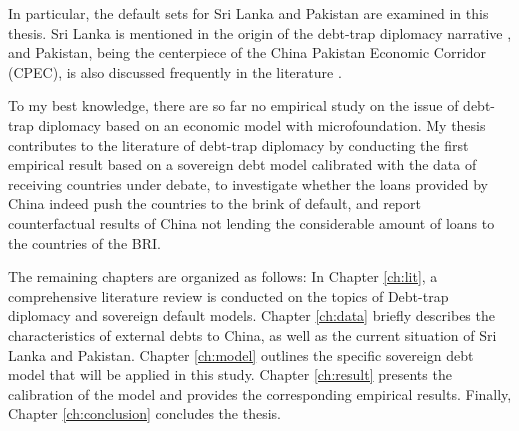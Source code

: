 In particular, the default sets for Sri Lanka and Pakistan are examined in this thesis. Sri Lanka is mentioned in the origin of the debt-trap diplomacy narrative \citep{Chellaney_2017}, and Pakistan, being the centerpiece of the China Pakistan Economic Corridor (CPEC), is also discussed frequently in the literature \citep{Hurley19-8-debt-trap}.

To my best knowledge, there are so far no empirical study on the issue of debt-trap diplomacy based on an economic model with microfoundation. My thesis contributes to the literature of debt-trap diplomacy by conducting the first empirical result based on a sovereign debt model calibrated with the data of receiving countries under debate, to investigate whether the loans provided by China indeed push the countries to the brink of default, and report counterfactual results of China not lending the considerable amount of loans to the countries of the BRI.

The remaining chapters are organized as follows:
In Chapter \ref{ch:lit}, a comprehensive literature review is conducted on the topics of Debt-trap diplomacy and sovereign default models.
Chapter \ref{ch:data} briefly describes the characteristics of external debts to China, as well as the current situation of Sri Lanka and Pakistan.
Chapter \ref{ch:model} outlines the specific sovereign debt model that will be applied in this study.
Chapter \ref{ch:result} presents the calibration of the model and provides the corresponding empirical results.
Finally, Chapter \ref{ch:conclusion} concludes the thesis.


